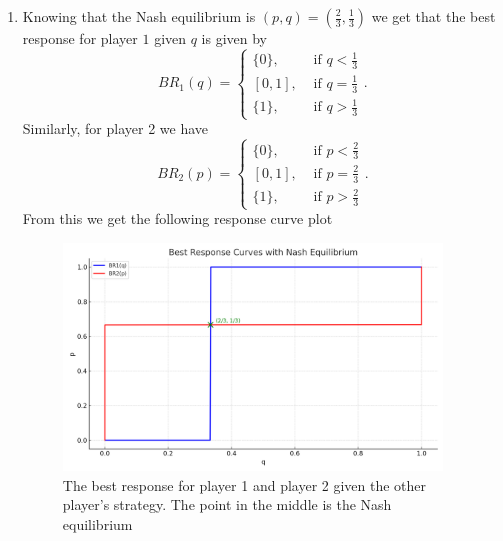\documentclass[a4paper]{article}
\begin{document}
\begin{exercise}{3}
\begin{enumerate}[label=(\alph*)]
\begin{enumerate}[label=(\roman*)]
        \item Knowing that the Nash equilibrium is $(p, q) =  \left( \frac{2}{3}, \frac{1}{3} \right) $ we get that the best response for player $ 1 $ given $ q $ is given by
          \begin{equation*}
          BR_1(q) = \begin{cases}
            \{0\}, &\text{ if }q < \frac{1}{3}\\
            [0, 1], &\text{ if } q = \frac{1}{3} \\
            \{1\}, &\text{ if } q > \frac{1}{3}
          \end{cases}
          .\end{equation*}
          Similarly, for player 2 we have
          \begin{equation*}
            BR_2(p) =
            \begin{cases}
              \{0\}, &\text{ if }p < \frac{2}{3}\\
              [0, 1], &\text{ if }p = \frac{2}{3}\\
              \{1\}, &\text{ if } p > \frac{2}{3}
            \end{cases}
          .\end{equation*}
          From this we get the following response curve plot
          \begin{figure}[H]
            \begin{center}
              \includegraphics[width=0.95\textwidth]{./figures/best_response_curves1.png}
            \end{center}
            \caption{The best response for player 1 and player 2 given the other player's strategy. The point in the middle is the Nash equilibrium}\label{fig:resp1}
          \end{figure}


\end{enumerate}
\end{enumerate}
\end{exercise}
\end{document}
